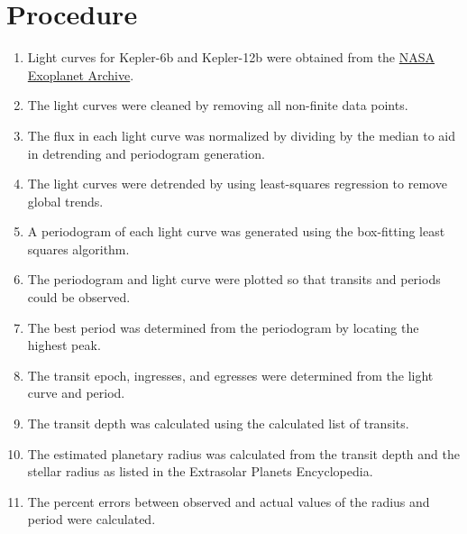 \section{Procedure}

\begin{enumerate}
    \item Light curves for Kepler-6b and Kepler-12b were obtained from the \href{http://exoplanetarchive.ipac.caltech.edu/}{NASA Exoplanet Archive}.
    \item The light curves were cleaned by removing all non-finite data points.
    \item The flux in each light curve was normalized by dividing by the median to aid in detrending and periodogram generation.
    \item The light curves were detrended by using least-squares regression to remove global trends. \autocite{untrendy}
    \item A periodogram of each light curve was generated using the box-fitting least squares algorithm. \autocite{bls, pythonBls}
    \item The periodogram and light curve were plotted so that transits and periods could be observed.
    \item The best period was determined from the periodogram by locating the highest peak.
    \item The transit epoch, ingresses, and egresses were determined from the light curve and period.
    \item The transit depth was calculated using the calculated list of transits.
    \item The estimated planetary radius was calculated from the transit depth and the stellar radius as listed in the Extrasolar Planets Encyclopedia. \autocite{exoplanetEncyclopedia}
    \item The percent errors between observed and actual values of the radius and period were calculated.
\end{enumerate}
